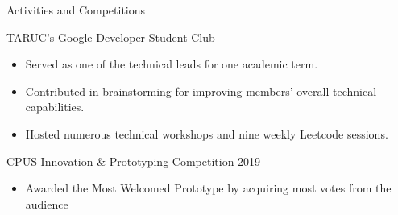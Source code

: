 \documentclass{article}
\newlength{\tabin}
\newlength{\secsep}
\newcommand{\lineunder}{\vspace*{-8pt} \\ \hspace*{-6pt} \hrulefill \\ \vspace*{-15pt}}
\newenvironment{tabbedsection}[1]{
  \begin{list}{}{
      \setlength{\itemsep}{0pt}
      \setlength{\labelsep}{0pt}
      \setlength{\labelwidth}{0pt}
      \setlength{\leftmargin}{\tabin}
      \setlength{\rightmargin}{\tabin}
      \setlength{\listparindent}{0pt}
      \setlength{\parsep}{0pt}
      \setlength{\parskip}{0pt}
      \setlength{\partopsep}{0pt}
      \setlength{\topsep}{#1}
    }
  \item[]
}{\end{list}}
\newenvironment{resume_section}[1]{
  \filbreak
  \vspace{2\secsep}
  \textsc{\large#1}
  \lineunder
  \begin{tabbedsection}{\secsep}
}{\end{tabbedsection}}
\newenvironment{resume_subsection}[2][]{
  \textbf{#2} \hfill {\footnotesize #1} \hspace{2em}
  \begin{tabbedsection}{0.5\secsep}
}{\end{tabbedsection}}
\newenvironment{subitems}{
  \renewcommand{\labelitemi}{-}
  \begin{itemize}
      \setlength{\labelsep}{1em}
}{\end{itemize}}
\begin{document}
\begin{resume_section}{Activities and Competitions}

  \begin{resume_subsection}{{TARUC's Google Developer Student Club}}
    \begin{subitems}
      \item Served as one of the technical leads for one academic term.
      \item Contributed in brainstorming for improving members' overall technical capabilities.
      \item Hosted numerous technical workshops and nine weekly Leetcode sessions.
    \end{subitems}
  \end{resume_subsection}



  \begin{resume_subsection}[(March 2019)]{CPUS Innovation \& Prototyping Competition 2019}
    \begin{subitems}
      \item Awarded the Most Welcomed Prototype by acquiring most votes from the audience
    \end{subitems}
  \end{resume_subsection}
\end{resume_section}
\end{document}
